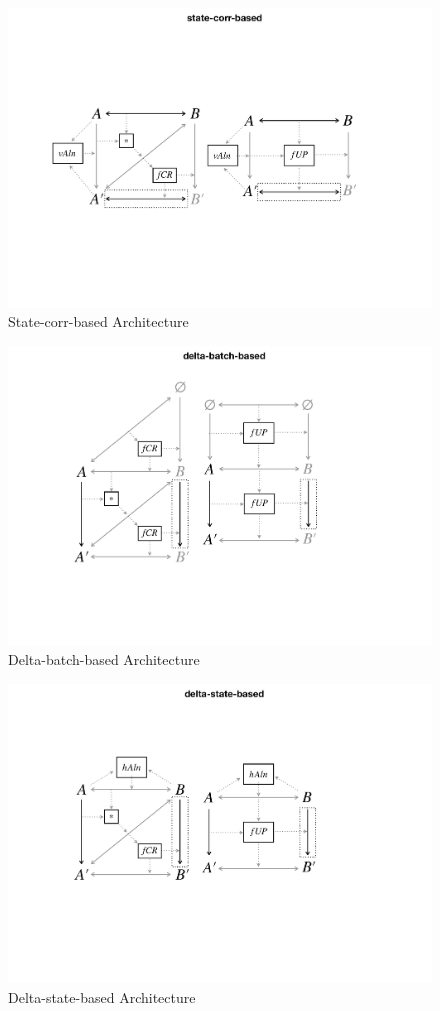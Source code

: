 \begin{figure}[tb!]
	\centering
	\includegraphics[width=\columnwidth]{diagrams/foundations//state-corr-based}
	\caption{State-corr-based Architecture}
	\label{fig:stateCorrBased}
\end{figure}

\begin{figure}[tb!]
	\centering
	\includegraphics[width=0.73\columnwidth]{diagrams/foundations//delta-batch-based}
	\caption{Delta-batch-based Architecture}
	\label{fig:deltaBatchBased}
\end{figure}

\begin{figure}[tb!]
	\centering
	\includegraphics[width=0.75\columnwidth]{diagrams/foundations//delta-state-based}
	\caption{Delta-state-based Architecture}
	\label{fig:deltaStateBased}
\end{figure}

